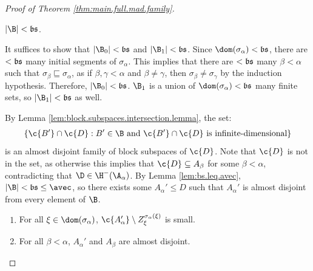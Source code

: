 \documentclass[11pt,reqno]{amsart}
\begin{document}
\begin{proof}[Proof of Theorem \ref{thm:main.full.mad.family}]
    \begin{claim}
    \label{claim:B.smaller.than.bs}
        $|\B| < \frak{bs}$.
    \end{claim}

    \begin{midproof}
        It suffices to show that $|\B_0| < \frak{bs}$ and $|\B_1| < \frak{bs}$. Since $\dom(\sigma_\alpha) < \frak{bs}$, there are $<\frak{bs}$ many initial segments of $\sigma_\alpha$. This implies that there are $<\frak{bs}$ many $\beta < \alpha$ such that $\sigma_\beta \sqsubseteq \sigma_\alpha$, as if $\beta,\gamma < \alpha$ and $\beta \neq \gamma$, then $\sigma_\beta \neq \sigma_\gamma$ by the induction hypothesis. Therefore, $|\B_0| < \frak{bs}$. $\B_1$ is a union of $\dom(\sigma_\alpha) < \frak{bs}$ many finite sets, so $|\B_1| < \frak{bs}$ as well. 
    \end{midproof}

    By Lemma \ref{lem:block.subspaces.intersection.lemma},  the set:
    \begin{align*}
        \{\c{B'} \cap \c{D} : B' \in \B \text{ and } \c{B'} \cap \c{D} \text{ is infinite-dimensional}\}
    \end{align*}
    is an almost disjoint family of block subspaces of $\c{D}$. Note that $\c{D}$ is not in the set, as otherwise this implies that $\c{D} \subseteq A_\beta$ for some $\beta < \alpha$, contradicting that $\D \in \H^-(\A_\alpha)$. By Lemma \ref{lem:bs.leq.avec}, $|\B| < \frak{bs} \leq \avec$, so there exists some $A_\alpha' \leq D$ such that $A_\alpha'$ is almost disjoint from every element of $\B$. 

    \begin{claim}
        \hfill
        \begin{enumerate}
            \item For all $\xi \in \dom(\sigma_\alpha)$, $\c{A_\alpha'} \setminus Z_\xi^{\sigma_\alpha(\xi)}$ is small.

            \item For all $\beta < \alpha$, $A_\alpha'$ and $A_\beta$ are almost disjoint.
        \end{enumerate}
    \end{claim}


\end{proof}
\end{document}
